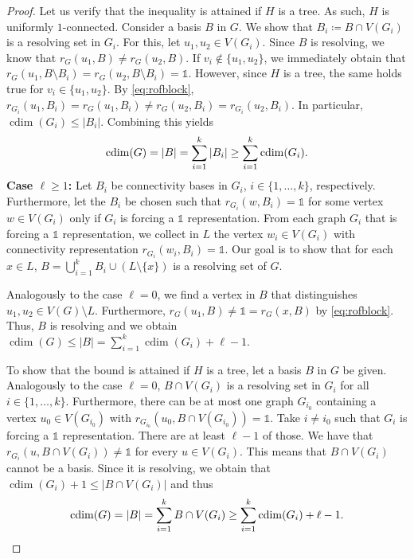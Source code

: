 \documentclass[letterpaper,12pt,headings=normal,parskip=half]{scrartcl}
\DeclareMathOperator{\cdim}{cdim}
\theoremstyle{definition}
\begin{document}
\begin{proof}
    Let us verify that the inequality is attained if $H$ is a tree. 
    As such, $H$ is uniformly \mbox{$1$-connected}.
    Consider a basis $B$ in $G$. 
    We show that $B_i\coloneqq B\cap V(G_i)$ is a resolving set in $G_i$.
    For this, let $u_1,u_2\in V(G_i)$. 
    Since $B$ is resolving, we know that $r_G(u_1,B)\neq r_G(u_2,B)$. 
    If $v_i\notin\{u_1,u_2\}$, we immediately obtain that $r_G(u_1,B\setminus B_i)=r_G(u_2,B\setminus B_i)=\mathds{1}$. 
    However, since $H$ is a tree, the same holds true for $v_i\in\{u_1,u_2\}$. 
    By \cref{eq:rofblock}, $r_{G_i}(u_1,B_i)=r_G(u_1,B_i)\neq r_G(u_2,B_i)=r_{G_i}(u_2,B_i)$.
    In particular, $\cdim(G_i)\leq|B_i|$.
    Combining this yields\vspace{-1ex} 
    \begin{equation*}
        \cdim(G)=|B|=\sum_{i=1}^k|B_i|\geq\sum_{i=1}^k\cdim(G_i).\vspace{-1ex}
    \end{equation*}    
    \textbf{Case $\ell\geq1$:} Let $B_i$ be connectivity bases in $G_i$, $i\in\{1,\ldots,k\}$, respectively. 
    Furthermore, let the $B_i$ be chosen such that $r_{G_i}(w,B_i)=\mathds{1}$ for some vertex $w\in V(G_i)$ only if $G_i$ is forcing a $\mathds{1}$ representation.
    From each graph $G_i$ that is forcing a $\mathds{1}$ representation, we collect in $L$ the vertex $w_i\in V(G_i)$ with connectivity representation $r_{G_i}(w_i,B_i)=\mathds{1}$.
    Our goal is to show that for each $x\in L$, $B=\bigcup_{i=1}^kB_i\cup(L\setminus\{x\})$ is a resolving set of $G$.
    
    Analogously to the case $\ell=0$, we find a vertex in $B$ that distinguishes $u_1,u_2\in V(G)\setminus L$. 
    Furthermore, $r_G(u_1,B)\neq\mathds{1}=r_G(x,B)$ by \cref{eq:rofblock}. 
    Thus, $B$ is resolving and we obtain $\cdim(G)\leq|B|=\sum_{i=1}^k\cdim(G_i)+\ell-1$.

    To show that the bound is attained if $H$ is a tree, let a basis $B$ in $G$ be given.
    Analogously to the case $\ell=0$, $B\cap V(G_i)$ is a resolving set in $G_i$ for all $i\in\{1,\ldots,k\}$. 
    Furthermore, there can be at most one graph $G_{i_0}$ containing a vertex $u_0\in V(G_{i_0})$ with $r_{G_{i_0}}(u_0,B\cap V(G_{i_0}))=\mathds{1}$. 
    Take $i\neq i_0$ such that $G_i$ is forcing a $\mathds{1}$ representation. 
    There are at least $\ell-1$ of those. 
    We have that $r_{G_i}(u,B\cap V(G_i))\neq\mathds{1}$ for every $u\in V(G_i)$. 
    This means that $B\cap V(G_i)$ cannot be a basis. 
    Since it is resolving, we obtain that $\cdim(G_i)+1\leq|B\cap V(G_i)|$ and thus
    \begin{equation*}
        \cdim(G)=|B|=\sum_{i=1}^k B\cap V(G_i)\geq\sum_{i=1}^k\cdim(G_i)+\ell-1.\qedhere
    \end{equation*}
\end{proof}
\end{document}

